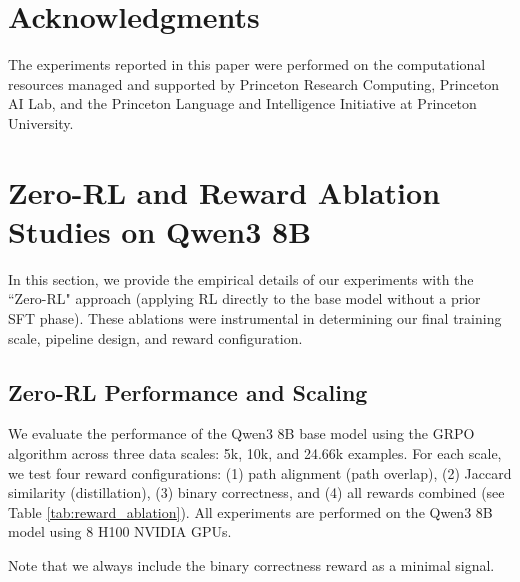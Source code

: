 \documentclass{article}
\theoremstyle{plain}
\theoremstyle{definition}
\theoremstyle{remark}
\begin{document}
\section*{Acknowledgments}

The experiments reported in this paper were performed on the computational resources managed and supported by Princeton Research Computing, Princeton AI Lab, and the Princeton Language and Intelligence Initiative at Princeton University.





\newpage
\appendix
\onecolumn

\section{Zero-RL and Reward Ablation Studies on Qwen3 8B}
\label{Appendix A}

In this section, we provide the empirical details of our experiments with the ``Zero-RL" approach (applying RL directly to the base model without a prior SFT phase). These ablations were instrumental in determining our final training scale, pipeline design, and reward configuration. 

\subsection{Zero-RL Performance and Scaling}
We evaluate the performance of the Qwen3 8B base model using the GRPO algorithm across three data scales: 5k, 10k, and 24.66k examples. For each scale, we test four reward configurations: (1) path alignment (path overlap), (2) Jaccard similarity (distillation), (3) binary correctness, and (4) all rewards combined (see Table \ref{tab:reward_ablation}). All experiments are performed on the Qwen3 8B model using 8 H100 NVIDIA GPUs.

Note that we always include the binary correctness reward as a minimal signal.
\end{document}
